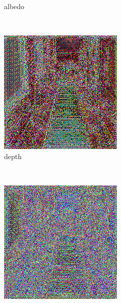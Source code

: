 \begin{figure}[h!]
\begin{subfigure}[b]{0.175\textwidth}
     \caption{albedo}\label{subfig:1}
    \end{subfigure}
    ~
    \begin{subfigure}[b]{0.175\textwidth}
     \includegraphics[width=\textwidth]{figures/result/single/depth/2.png}
     \caption{depth}
    \end{subfigure}
    ~
    \begin{subfigure}[b]{0.175\textwidth}
     \includegraphics[width=\textwidth]{figures/result/single/emissive/2.png}

\end{subfigure}
\end{figure}
